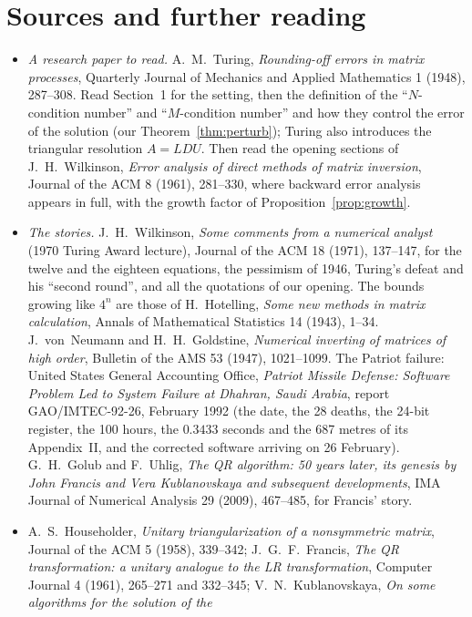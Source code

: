 \section*{Sources and further reading}

\begin{itemize}
\item \emph{A research paper to read.} A.~M.~Turing, \emph{Rounding-off errors in matrix processes}, Quarterly Journal of Mechanics and Applied Mathematics 1
(1948), 287--308. Read Section~1 for the setting, then the definition of the ``$N$-condition number'' and ``$M$-condition number'' and how they control the error of
the solution (our Theorem~\ref{thm:perturb}); Turing also introduces the triangular resolution $A=LDU$. Then read the opening sections of J.~H.~Wilkinson,
\emph{Error analysis of direct methods of matrix inversion}, Journal of the ACM 8 (1961), 281--330, where backward error analysis appears in full, with the growth
factor of Proposition~\ref{prop:growth}.
\item \emph{The stories.} J.~H.~Wilkinson, \emph{Some comments from a numerical analyst} (1970 Turing Award lecture), Journal of the ACM 18 (1971), 137--147, for
the twelve and the eighteen equations, the pessimism of 1946, Turing's defeat and his ``second round'', and all the quotations of our opening. The bounds growing like
$4^n$ are those of H.~Hotelling, \emph{Some new methods in matrix calculation}, Annals of Mathematical Statistics 14 (1943), 1--34. J.~von~Neumann and H.~H.~Goldstine,
\emph{Numerical inverting of matrices of high order}, Bulletin of the AMS 53 (1947), 1021--1099. The Patriot failure: United States General Accounting Office,
\emph{Patriot Missile Defense: Software Problem Led to System Failure at Dhahran, Saudi Arabia}, report GAO/IMTEC-92-26, February 1992 (the date, the 28 deaths, the
24-bit register, the 100 hours, the $0.3433$ seconds and the 687 metres of its Appendix~II, and the corrected software arriving on 26 February). G.~H.~Golub and F.~Uhlig,
\emph{The QR algorithm: 50 years later, its genesis by John Francis and Vera Kublanovskaya and subsequent developments}, IMA Journal of Numerical Analysis 29 (2009), 467--485,
for Francis' story.
\item A.~S.~Householder, \emph{Unitary triangularization of a nonsymmetric matrix}, Journal of the ACM 5 (1958), 339--342; J.~G.~F.~Francis, \emph{The QR transformation:
a unitary analogue to the LR transformation}, Computer Journal 4 (1961), 265--271 and 332--345; V.~N.~Kublanovskaya, \emph{On some algorithms for the solution of the
}
\end{itemize}

